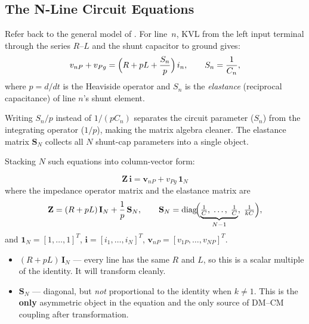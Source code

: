 \subsection{The N-Line Circuit Equations}

Refer back to the general model of .
For line~$n$, KVL from the left input terminal through the series
$R$--$L$ and the shunt capacitor to ground gives:
\[
    v_{nP} + v_{Pg}
    = \Bigl(R + pL + \frac{S_n}{p}\Bigr)\,i_n,
    \qquad S_n = \frac{1}{C_n},
\]
where $p = d/dt$ is the Heaviside operator and $S_n$ is the
\emph{elastance} (reciprocal capacitance) of line $n$'s shunt element.

\begin{physbox}
Writing $S_n/p$ instead of $1/(pC_n)$ separates the circuit
parameter ($S_n$) from the integrating operator ($1/p$), making
the matrix algebra cleaner.  The elastance matrix $\mathbf{S}_N$
collects all $N$ shunt-cap parameters into a single object.
\end{physbox}

Stacking $N$ such equations into column-vector form:

\begin{eqnbox}
\begin{equation}
    \mathbf{Z}\,\mathbf{i}
    = \mathbf{v}_{nP} + v_{Pg}\,\mathbf{1}_N
    \label{eq:MMeqn}
\end{equation}
where the impedance operator matrix and the elastance matrix are
\[
    \mathbf{Z}
    = (R + pL)\,\mathbf{I}_N + \frac{1}{p}\,\mathbf{S}_N,
    \qquad
    \mathbf{S}_N
    = \operatorname{diag}\!\Bigl(
        \underbrace{\tfrac{1}{C},\;\ldots,\;\tfrac{1}{C}}_{N-1},\;
        \tfrac{1}{kC}
      \Bigr),
\]
and $\mathbf{1}_N = [1,\ldots,1]^T$,\;
$\mathbf{i} = [i_1,\ldots,i_N]^T$,\;
$\mathbf{v}_{nP} = [v_{1P},\ldots,v_{NP}]^T$.
\end{eqnbox}

\begin{statebox}
\begin{itemize}
    \item $(R + pL)\,\mathbf{I}_N$ — every line has the same $R$
          and $L$, so this is a scalar multiple of the identity.
          It will transform cleanly.
    \item $\mathbf{S}_N$ — diagonal, but \emph{not} proportional
          to the identity when $k \neq 1$.  This is the \textbf{only}
          asymmetric object in the equation and the only source of
          DM--CM coupling after transformation.
\end{itemize}
\end{statebox}

